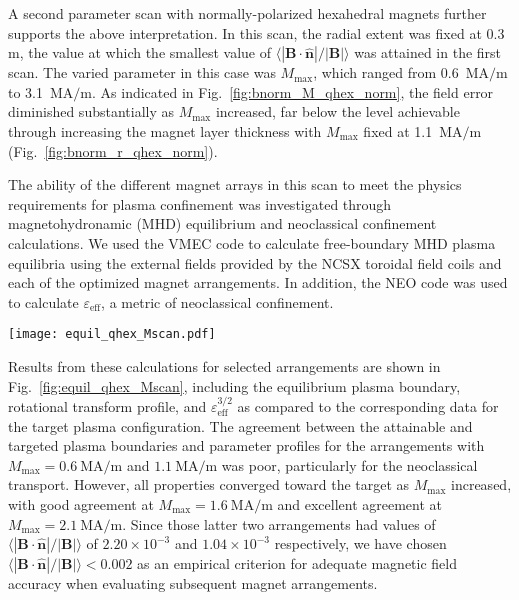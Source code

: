 \documentclass[11pt,onecolumn]{article}
\newcommand{\relbnorm}{\langle|\mathbf{B}\cdot\hat{\mathbf{n}}|
                       /|\mathbf{B}|\rangle}
\begin{document}
A second parameter scan with normally-polarized hexahedral magnets further
supports the above interpretation. In this scan, the radial extent was fixed
at 0.3 m, the value at which the smallest value of 
$\relbnorm$ was attained in the first scan.
The varied parameter in this case was $M_\text{max}$, which ranged from
0.6~$\text{MA}/\text{m}$ to 3.1~$\text{MA}/\text{m}$.
As indicated in Fig.~\ref{fig:bnorm_M_qhex_norm}, the field error diminished
substantially as $M_\text{max}$ increased, far below the level achievable
through increasing the magnet layer thickness with $M_\text{max}$ fixed
at 1.1~$\text{MA}/\text{m}$ (Fig.~\ref{fig:bnorm_r_qhex_norm}).

The ability of the different magnet arrays in this scan to meet the 
physics requirements for plasma confinement was investigated through
magnetohydronamic (MHD) equilibrium and neoclassical confinement calculations.
We used the VMEC code \cite{hirshman1983a,hirshman1986a} to calculate 
free-boundary MHD plasma equilibria using the external fields provided by the 
NCSX toroidal
field coils and each of the optimized magnet arrangements. In addition,
the NEO code \cite{nemov1999a} was used to calculate $\varepsilon_\text{eff}$,
a metric of neoclassical confinement. 

\begin{figure*}
    \begin{center}
    \texttt{[image: equil\_qhex\_Mscan.pdf]}
    \caption{Results of MHD equilibrium and neoclassical transport calculations
             for plasmas confined by an arrangement of hexahedral magnets with
             differing values of $M_\text{max}$.
             (a) Plasma boundary at toroidal angle $\phi=0^\circ$;
             (b) Plasma boundary at toroidal angle $\phi=60^\circ$;
             (c) Profile of rotational transform;
             (d) Profile of $\varepsilon_\text{eff}^{3/2}$.}
    \label{fig:equil_qhex_Mscan}
    \end{center}
\end{figure*}

Results from these calculations for selected arrangements are shown in
Fig.~\ref{fig:equil_qhex_Mscan}, including the equilibrium plasma boundary,
rotational transform profile, and $\varepsilon_\text{eff}^{3/2}$ as compared
to the corresponding data for the target plasma configuration. The agreement
between the attainable and targeted plasma boundaries and parameter profiles 
for the arrangements with $M_\text{max}=0.6~\text{MA}/\text{m}$ and 
$1.1~\text{MA}/\text{m}$ was poor, particularly for the neoclassical
transport. However, all properties converged toward the target as 
$M_\text{max}$ increased, with good agreement at 
$M_\text{max}=1.6~\text{MA}/\text{m}$ and excellent agreement at
$M_\text{max}=2.1~\text{MA}/\text{m}$. Since those latter two arrangements
had values of $\relbnorm$ of $2.20\times{10}^{-3}$ and $1.04\times{10}^{-3}$
respectively, we have chosen $\relbnorm<0.002$ as an empirical criterion
for adequate magnetic field accuracy when evaluating subsequent magnet
arrangements.
\end{document}
